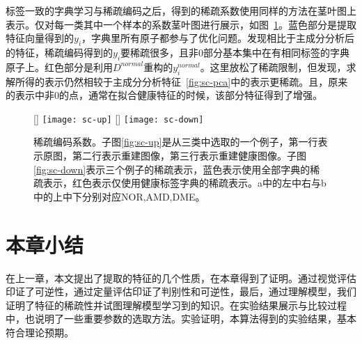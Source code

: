     标签一致的字典学习与稀疏编码之后，得到的稀疏系数使用同样的方法在茎叶图上表示。仅对每一类其中一个样本的系数茎叶图进行展示，如图~\ref{fig:sc-dict}。蓝色部分是提取特征向量得到的$y_i$，字典里所有原子都参与了优化问题。发现相比于主成分分析后的特征，稀疏编码得到的$y_i$要稀疏很多，且非0部分基本集中在有相同标签的字典原子上。红色部分是利用$D^{normal}$重构的$y^{normal}_i$。这里放松了稀疏限制，但发现，求解所得的表示仍然相较于主成分分析特征~\ref{fig:sc-pca}中的表示更稀疏。且，原来的表示中非0的点，通常在拟合健康特征的时候，该部分特征得到了增强。 

    \begin{figure}[htb]
      \centering%
      [\textwidth] %
        {\texttt{[image: sc-up]}} 
        \vspace{1em}
      [\textwidth] %
        {\texttt{[image: sc-down]}} 

      \caption[稀疏编码]{稀疏编码系数。子图\ref{fig:sc-up}是从三类中选取的一个例子，第一行表示原图，第二行表示重建图像，第三行表示重建健康图像。子图\ref{fig:sc-down}表示三个例子的稀疏表示，蓝色表示使用全部字典的稀疏表示，红色表示仅使用健康标签字典的稀疏表示。a中的左中右与b中的上中下分别对应NOR,AMD,DME。}
      \label{fig:sc-dict}
    \end{figure}

\section{本章小结}
    在上一章，本文提出了提取的特征的几个性质，在本章得到了证明。通过视觉评估印证了可逆性，通过定量评估印证了判别性和可逆性，最后，通过理解模型，我们证明了特征的稀疏性并试图理解模型学习到的知识。在实验结果展示与比较过程中，也说明了一些重要参数的选取方法。实验证明，本算法得到的实验结果，基本符合理论预期。


